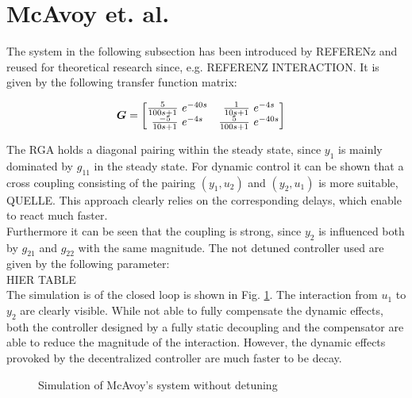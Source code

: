 \newpage

\section{McAvoy et. al.}%
\label{c:fotd:s:mcavoy}

The system in the following subsection has been introduced by REFERENz and reused for theoretical research since, e.g. REFERENZ INTERACTION. It is given by the following transfer function matrix:

\begin{align*}
\begin{split}
\mbox{\boldmath$G$} &= \begin{bmatrix}
\frac{5}{100s+1}~e^{-40s} & \frac{1}{10s+1}~e^{-4s} \\
\frac{-5}{10s+1}~e^{-4s} & \frac{5}{100s+1}~e^{-40s}
\end{bmatrix}
\end{split}
\end{align*}

The RGA holds a diagonal pairing within the steady state, since $y_1$ is mainly dominated by $g_{11}$ in the steady state. For dynamic control it can be shown that a cross coupling consisting of the pairing $\left(y_1,u_2\right)$ and $\left(y_2,u_1\right)$ is more suitable, QUELLE. This approach clearly relies on the corresponding delays, which enable to react much faster.\\

Furthermore it can be seen that the coupling is strong, since $y_2$ is influenced both by $g_{21}$ and $g_{22}$ with the same magnitude. The not detuned controller used are given by the following parameter:\\

HIER TABLE\\

The simulation is of the closed loop is shown in Fig. \ref{c:fotd:s:mcavoy:f:SimNotDetuned}. The interaction from $u_1$ to $y_2$ are clearly visible. While not able to fully compensate the dynamic effects, both the controller designed by a fully static decoupling and the compensator are able to reduce the magnitude of the interaction. However, the dynamic effects provoked by the decentralized controller are much faster to be decay.

\begin{figure}[H]\centering

\caption{Simulation of McAvoy's system without detuning}
\label{c:fotd:s:mcavoy:f:SimNotDetuned}
\end{figure}

